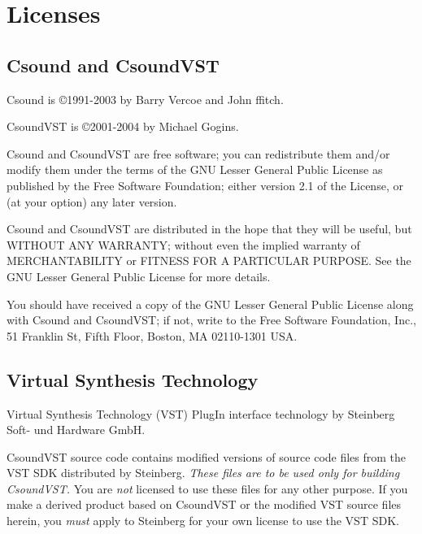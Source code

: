 \documentclass[10pt,letterpaper,onecolumn]{book}
\begin{document}
\section{Licenses}

\subsection{Csound and CsoundVST}

Csound is \copyright 1991-2003 by Barry Vercoe and John ffitch.

CsoundVST is \copyright 2001-2004 by Michael Gogins.

Csound and CsoundVST are free software; you can redistribute them and/or modify them under the terms of the GNU Lesser General Public License as published by the Free Software Foundation; either version 2.1 of the License, or (at your option) any later version.

Csound and CsoundVST are distributed in the hope that they will be useful, but WITHOUT ANY WARRANTY; without even the implied warranty of MERCHANTABILITY or FITNESS FOR A PARTICULAR PURPOSE.  See the GNU Lesser General Public License for more details.

You should have received a copy of the GNU Lesser General Public License along with Csound and CsoundVST; if not, write to the Free Software Foundation, Inc., 51 Franklin St, Fifth Floor, Boston, MA 02110-1301 USA.
\subsection{Virtual Synthesis Technology}
Virtual Synthesis Technology (VST) PlugIn interface technology by Steinberg Soft- und Hardware GmbH. 

CsoundVST source code contains modified versions of source code files from the VST SDK distributed by Steinberg. \emph{These files are to be used only for building CsoundVST.} You are \emph{not} licensed to use these files for any other purpose. If you make a derived product based on CsoundVST or the modified VST source files herein, you \emph{must} apply to Steinberg for your own license to use the VST SDK.
\end{document}
